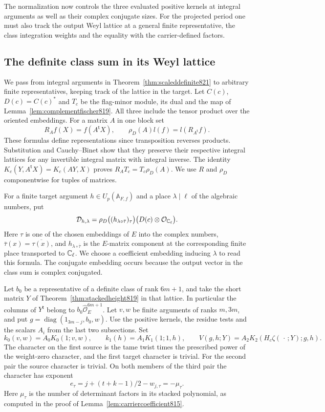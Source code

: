 \documentclass[a4paper,11pt]{article}
\theoremstyle{definition}
\theoremstyle{remark}
\numberwithin{equation}{section}
\newcommand{\OO}{\mathcal O}
\begin{document}
The normalization now controls the three evaluated positive
kernels at integral arguments as well as their complex
conjugate sizes. For the projected period one must also track
the output Weyl lattice at a general finite representative,
the class integration weights and the equality with the
carrier-defined factors.
\clearpage

\subsection{The definite class sum in its Weyl lattice}
\label{sec:definiteclass822}
We pass from integral arguments in Theorem~\ref{thm:scaleddefinite821}
to arbitrary finite representatives, keeping track of the lattice
in the target. Let \(C(c)\), \(D(c)=C(c)^*\) and \(T_c\) be the
flag-minor module, its dual and the map of
Lemma~\ref{lem:complementfischer819}. All three include the
tensor product over the oriented embeddings. For a matrix \(A\)
in one block set
\[
       R_A f(X)=f(A^{\mathsf t} X),\qquad
       \rho_D(A)l(f)=l(R_{A^{\mathsf t}} f).
\]
These formulas define representations since transposition reverses
products. Substitution and Cauchy--Binet show that they preserve
their respective integral lattices for any invertible integral
matrix with integral inverse. The identity
\(K_c(Y,A^{\mathsf t}X)=K_c(AY,X)\) proves
\(R_A T_c=T_c\rho_D(A)\). We use \(R\) and \(\rho_D\)
componentwise for tuples of matrices.

For a finite target argument \(h\in U_p(\mathbb A_{F,f})\)
and a place \(\lambda\mid\ell\) of the algebraic numbers, put
\[
   {\cal D}_{h,\lambda}
      =\rho_D\big((h_{\lambda\circ\bar\tau})_\tau\big)
                  \bigl(D(c)\otimes\mathcal O_{\mathbb C_\ell}\bigr).
\]
Here \(\tau\) is one of the chosen embeddings of \(E\) into
the complex numbers, \(\bar\tau(x)=\overline{\tau(x)}\),
and \(h_{\lambda\circ\bar\tau}\) is the \(E\)-matrix component
at the corresponding finite place transported to \(\mathbb C_\ell\).
We choose a coefficient embedding inducing \(\lambda\) to
read this formula. The conjugate embedding occurs because the
output vector in the class sum is complex conjugated.

Let \(b_0\) be a representative of a definite class of rank
\(6m+1\), and take the short matrix \(Y\) of
Theorem~\ref{thm:stackedheight819} in that lattice. In
particular the columns of \(Y^{\mathsf t}\) belong to
\(b_0\widehat{\OO}_E^{6m+1}\). Let \(v,w\) be finite
arguments of ranks \(m,3m\), and put
\(g=\operatorname{diag}(1_{3m-j},b_0,w)\). Use the positive
kernels, the residue tests and the scalars \(A_i\) from the
last two subsections. Set
\[
 k_0(v,w)=A_0 K_0(1;v,w),\qquad
 k_1(h)=A_1 K_1(1;1,h),\qquad
 V(g,h;Y)=A_2 K_2(H_c\zeta(\,\cdot\,;Y);g,h).
\]
The character on the first source is the tame twist times
the prescribed power of the weight-zero character, and the
first target character is trivial. For the second pair the
source character is trivial. On both members of the third
pair the character has exponent
\[
        e_\tau=j+(t+k-1)/2-w_{j,\tau}=-\mu_\tau .
\]
Here \(\mu_\tau\) is the number of determinant factors in its
stacked polynomial, as computed in the proof of
Lemma~\ref{lem:carriercoefficient815}.
\end{document}
